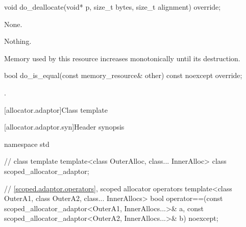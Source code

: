 %
\begin{itemdecl}
void do_deallocate(void* p, size_t bytes, size_t alignment) override;
\end{itemdecl}

\begin{itemdescr}
\pnum
\effects
None.

\pnum
\throws
Nothing.

\pnum
\remarks
Memory used by this resource increases monotonically until its destruction.
\end{itemdescr}

%
\begin{itemdecl}
bool do_is_equal(const memory_resource& other) const noexcept override;
\end{itemdecl}

\begin{itemdescr}
\pnum
\returns
{}.
\end{itemdescr}


[allocator.adaptor]{Class template }

[allocator.adaptor.syn]{Header  synopsis}

%
\begin{codeblock}
namespace std {
  // class template 
  template<class OuterAlloc, class... InnerAlloc>
    class scoped_allocator_adaptor;

  // \ref{scoped.adaptor.operators}, scoped allocator operators
  template<class OuterA1, class OuterA2, class... InnerAllocs>
    bool operator==(const scoped_allocator_adaptor<OuterA1, InnerAllocs...>& a,
                    const scoped_allocator_adaptor<OuterA2, InnerAllocs...>& b) noexcept;
}
\end{codeblock}

